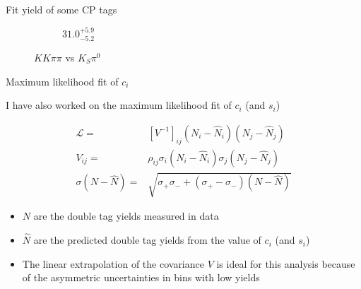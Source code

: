 \documentclass{beamer}
\begin{document}
\begin{frame}{Fit yield of some CP tags}
\begin{figure}
\begin{subfigure}{0.49\textwidth}
      \caption{$31.0^{+5.9}_{-5.2}$}
    \end{subfigure}
    \caption{$KK\pi\pi$ vs $K_S\pi^0$}
  \end{figure}
\end{frame}

\begin{frame}{Maximum likelihood fit of \texorpdfstring{$c_i$}{ci}}
  \begin{center}
    I have also worked on the maximum likelihood fit of $c_i$ (and $s_i$)
  \end{center}
  \begin{align*}
    \mathcal{L} =& [V^{-1}]_{ij}(N_i - \hat{N}_i)(N_j - \hat{N}_j) \\
    V_{ij} =& \rho_{ij}\sigma_i(N_i - \hat{N}_i)\sigma_j(N_j - \hat{N}_j) \\
    \sigma(N - \hat{N}) =& \sqrt{\sigma_+\sigma_- + (\sigma_+ - \sigma_-)(N - \hat{N})}
  \end{align*}
  \begin{itemize}
    \setlength\itemsep{1.0em}
    \item{$N$ are the double tag yields measured in data}
    \item{$\hat{N}$ are the predicted double tag yields from the value of $c_i$ (and $s_i$)}
    \item{The linear extrapolation of the covariance $V$ is ideal for this analysis because of the asymmetric uncertainties in bins with low yields}
  \end{itemize}
\end{frame}
\end{document}
